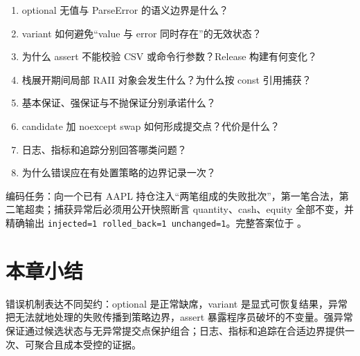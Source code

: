 \begin{enumerate}
  \item optional 无值与 ParseError 的语义边界是什么？
  \item variant 如何避免“value 与 error 同时存在”的无效状态？
  \item 为什么 assert 不能校验 CSV 或命令行参数？Release 构建有何变化？
  \item 栈展开期间局部 RAII 对象会发生什么？为什么按 const 引用捕获？
  \item 基本保证、强保证与不抛保证分别承诺什么？
  \item candidate 加 noexcept swap 如何形成提交点？代价是什么？
  \item 日志、指标和追踪分别回答哪类问题？
  \item 为什么错误应在有处置策略的边界记录一次？
\end{enumerate}

编码任务：向一个已有 AAPL 持仓注入“两笔组成的失败批次”，第一笔合法，第二笔超卖；捕获异常后必须用公开快照断言 quantity、cash、equity 全部不变，并精确输出 \texttt{injected=1 rolled\_back=1 unchanged=1}。完整答案位于 。


\section{本章小结}

错误机制表达不同契约：optional 是正常缺席，variant 是显式可恢复结果，异常把无法就地处理的失败传播到策略边界，assert 暴露程序员破坏的不变量。强异常保证通过候选状态与无异常提交点保护组合；日志、指标和追踪在合适边界提供一次、可聚合且成本受控的证据。
